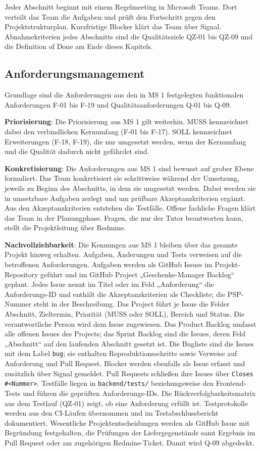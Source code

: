 \documentclass[11pt,a4paper]{article}
\begin{document}
Jeder Abschnitt beginnt mit einem Regelmeeting in Microsoft Teams. Dort verteilt das Team die Aufgaben und prüft den Fortschritt gegen den Projektstrukturplan. Kurzfristige Blocker klärt das Team über Signal. Abnahmekriterien jedes Abschnitts sind die Qualitätsziele QZ-01 bis QZ-09 und die Definition of Done am Ende dieses Kapitels.

\subsection{Anforderungsmanagement}

Grundlage sind die Anforderungen aus den in MS 1 festgelegten funktionalen Anforderungen F-01 bis F-19 und Qualitätsanforderungen Q-01 bis Q-09.

\textbf{Priorisierung}: Die Priorisierung aus MS 1 gilt weiterhin. MUSS kennzeichnet dabei den verbindlichen Kernumfang (F-01 bis F-17). SOLL kennzeichnet Erweiterungen (F-18, F-19), die nur umgesetzt werden, wenn der Kernumfang und die Qualität dadurch nicht gefährdet sind.

\textbf{Konkretisierung}: Die Anforderungen aus MS 1 sind bewusst auf grober Ebene formuliert. Das Team konkretisiert sie schrittweise während der Umsetzung, jeweils zu Beginn des Abschnitts, in dem sie umgesetzt werden. Dabei werden sie in umsetzbare Aufgaben zerlegt und um prüfbare Akzeptanzkriterien ergänzt. Aus den Akzeptanzkriterien entstehen die Testfälle. Offene fachliche Fragen klärt das Team in der Planungphase. Fragen, die nur der Tutor beantworten kann, stellt die Projektleitung über Redmine.

\textbf{Nachvollziehbarkeit}: Die Kennungen aus MS 1 bleiben über das gesamte Projekt hinweg erhalten. Aufgaben, Änderungen und Tests verweisen auf die betroffenen Anforderungen. Aufgaben werden als GitHub Issues im Projekt-Repository geführt und im GitHub Project „Geschenke-Manager Backlog“ geplant. Jedes Issue nennt im Titel oder im Feld „Anforderung“ die Anforderungs-ID und enthält die Akzeptanzkriterien als Checkliste; die PSP-Nummer steht in der Beschreibung. Das Project führt je Issue die Felder Abschnitt, Zieltermin, Priorität (MUSS oder SOLL), Bereich und Status. Die verantwortliche Person wird dem Issue zugewiesen. Das Product Backlog umfasst alle offenen Issues des Projects; das Sprint Backlog sind die Issues, deren Feld „Abschnitt“ auf den laufenden Abschnitt gesetzt ist. Die Bugliste sind die Issues mit dem Label \texttt{bug}; sie enthalten Reproduktionsschritte sowie Verweise auf Anforderung und Pull Request. Blocker werden ebenfalls als Issue erfasst und zusätzlich über Signal gemeldet. Pull Requests schließen ihre Issues über \texttt{Closes \#<Nummer>}. Testfälle liegen in \texttt{backend/\allowbreak{}tests/\allowbreak{}} beziehungsweise den Frontend-Tests und führen die geprüften Anforderungs-IDs. Die Rückverfolgbarkeitsmatrix aus dem Testlauf (QZ-01) zeigt, ob eine Anforderung erfüllt ist. Testprotokolle werden aus den CI-Läufen übernommen und im Testabschlussbericht dokumentiert. Wesentliche Projektentscheidungen werden als GitHub Issue mit Begründung festgehalten, die Prüfungen der Liefergegenstände samt Ergebnis im Pull Request oder am zugehörigen Redmine-Ticket. Damit wird Q-09 abgedeckt.
\end{document}
